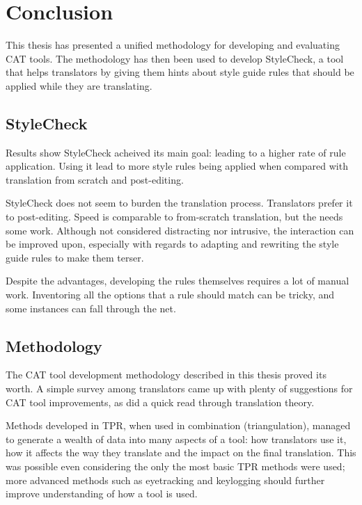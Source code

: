 \chapter{Conclusion}

\label{ch:conclusion}

\noindent This thesis has presented a unified methodology for developing and evaluating \ac{CAT} tools. The methodology has then been used to develop StyleCheck, a tool that helps translators by giving them hints about style guide rules that should be applied while they are translating.


\section{StyleCheck}

\noindent Results show StyleCheck acheived its main goal: leading to a higher rate of rule application. Using it lead to more style rules being applied when compared with translation from scratch and post-editing.

StyleCheck does not seem to burden the translation process. Translators prefer it to post-editing. Speed is comparable to from-scratch translation, but the  needs some work. Although not considered distracting nor intrusive, the interaction can be improved upon, especially with regards to adapting and rewriting the style guide rules to make them terser.

Despite the advantages, developing the rules themselves requires a lot of manual work. Inventoring all the options that a rule should match can be tricky, and some instances can fall through the net. 


\section{Methodology}

\noindent The \ac{CAT} tool development methodology described in this thesis proved its worth. A simple survey among translators came up with plenty of suggestions for \ac{CAT} tool improvements, as did a quick read through translation theory.

Methods developed in \ac{TPR}, when used in combination (triangulation), managed to generate a wealth of data into many aspects of a tool: how translators use it, how it affects the way they translate and the impact on the final translation. This was possible even considering the only the most basic \ac{TPR} methods were used; more advanced methods such as eyetracking and keylogging should further improve understanding of how a tool is used.

